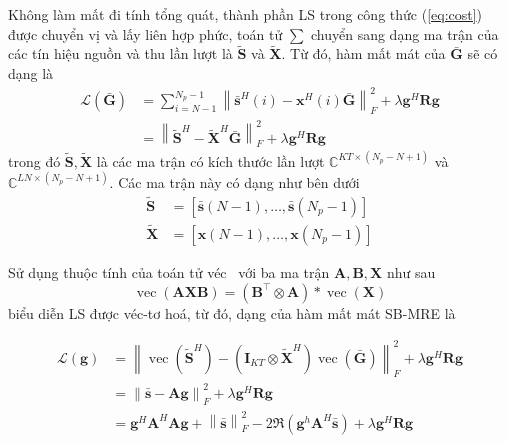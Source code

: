 Không làm mất đi tính tổng quát, thành phần LS trong công thức (\ref{eq:cost}) được chuyển vị và lấy liên hợp phức, toán tử $\sum$ chuyển sang dạng ma trận của các tín hiệu nguồn và thu lần lượt là $\widetilde{\mathbf{S}}$ và $\widetilde{\mathbf{X}}$. Từ đó, hàm mất mát của $\bar{\mathbf{G}}$ sẽ có dạng là
\begin{equation}
    \begin{aligned}
    \mathcal{L}(\bar{\mathbf{G}})&=\sum_{i=N-1}^{N_{p} - 1}\left\|{\bar{\mathbf{s}}^H(i)}- \mathbf{x}^H(i) \bar{\mathbf{G}}\right\|^2_F +\lambda \mathbf{g}^H \mathbf{R} \mathbf{g}\\
    &=\left\|\widetilde{\mathbf{S}}^H-\widetilde{\mathbf{X}}^H \bar{\mathbf{G}}\right\|^2_F +\lambda \mathbf{g}^H \mathbf{R} \mathbf{g}
    \end{aligned}
\end{equation}
trong đó $\widetilde{\mathbf{S}}, \widetilde{\mathbf{X}}$ là các ma trận có kích thước lần lượt $\mathbb{C}^{KT \times (N_p -N +1)}$ và $\mathbb{C}^{LN \times (N_p-N+1)}$. Các ma trận này có dạng như bên dưới
\begin{equation}
    \begin{aligned}
        \widetilde{\mathbf{S}} &= [\bar{\mathbf{s}}(N-1), \ldots, \bar{\mathbf{s}}\left(N_{p} - 1\right)] \\
        \widetilde{\mathbf{X}} &= [\mathbf{x}(N-1), \ldots, \mathbf{x}\left(N_{p} - 1\right)]
    \end{aligned}
\end{equation}

Sử dụng thuộc tính của toán tử véc~\cite{Minka2000} với ba ma trận $\mathbf{A, B, X}$ như sau
\begin{equation}
    \operatorname{vec}(\mathbf{AXB}) = (\mathbf{B}^\top \otimes \mathbf{A}) * \operatorname{vec}(\mathbf{X})
\end{equation}
biểu diễn LS được véc-tơ hoá, từ đó, dạng của hàm mất mát SB-MRE là

\begin{equation}
\label{eq:cost_final}
    \begin{aligned}
    \mathcal{L}(\mathbf{g}) &= \left\|\operatorname{vec}(\widetilde{\mathbf{S}}^H) - (\mathbf{I}_{KT} \otimes \widetilde{\mathbf{X}}^H) \operatorname{vec}(\bar{\mathbf{G}})\right\|^2_F + \lambda \mathbf{g}^H \mathbf{R} \mathbf{g}\\
         &= \left\| \bar{\mathbf{s}} - \mathbf{A} \mathbf{g} \right\|^2_F + \lambda \mathbf{g}^H \mathbf{R} \mathbf{g} \\
         &= \mathbf{g}^H \mathbf{A}^H \mathbf{A} \mathbf{g} + \left\| \bar{\mathbf{s}} \right\|^2_F - 2\Re (\mathbf{g}^h \mathbf{A}^H \bar{\mathbf{s}}) + \lambda \mathbf{g}^H \mathbf{R} \mathbf{g}    \end{aligned}
\end{equation}

